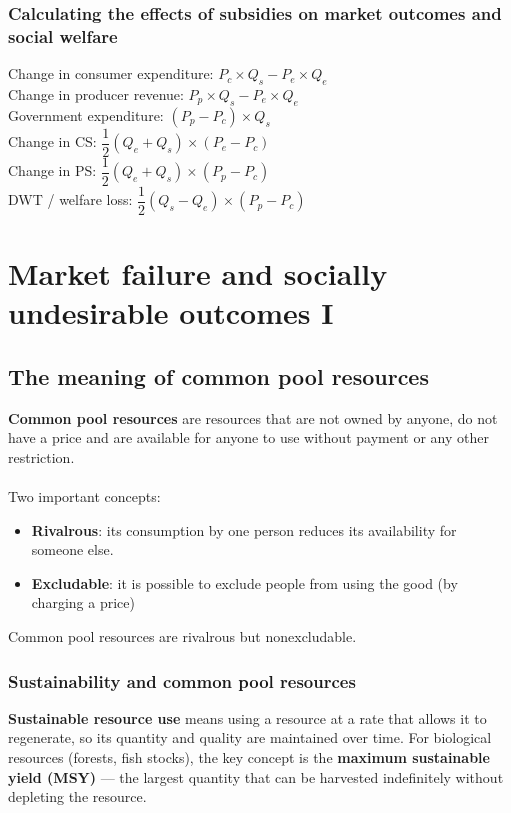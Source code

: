 \documentclass[a4paper,12pt]{article}
\newcommand{\needbold}[1]{\textcolor{red!70!black}{\textbf{#1}}}
\begin{document}
\subsubsection*{Calculating the effects of subsidies on market outcomes and social welfare}
Change in consumer expenditure: $P_c\times Q_s-P_e\times Q_e$\\
Change in producer revenue: $P_p\times Q_s-P_e\times Q_e$\\
Government expenditure: $(P_p-P_c)\times Q_s$\\
Change in CS: $\dfrac{1}{2}(Q_e+Q_s)\times (P_e-P_c)$\\
Change in PS: $\dfrac{1}{2}(Q_e+Q_s)\times (P_p-P_c)$\\
DWT / welfare loss: $\dfrac{1}{2}(Q_s-Q_e)\times (P_p-P_c)$
\section{Market failure and socially undesirable outcomes I}\label{sec:market-failure-1}
\subsection{The meaning of common pool resources}
\needbold{Common pool resources} are resources that are not owned by anyone, do not have a price and are available for anyone to use without payment or any other restriction.\\\\
Two important concepts:
\begin{itemize}
  \item \needbold{Rivalrous}: its consumption by one person reduces its availability for someone else.
  \item \needbold{Excludable}: it is possible to exclude people from using the good (by charging a price)
\end{itemize}
Common pool resources are rivalrous but non­excludable. 
\subsubsection*{Sustainability and common pool resources}
\textbf{Sustainable resource use} means using a resource at a rate that allows it to regenerate, so its quantity and quality are maintained over time. For biological resources (forests, fish stocks), the key concept is the \textbf{maximum sustainable yield (MSY)} --- the largest quantity that can be harvested indefinitely without depleting the resource.
\end{document}
